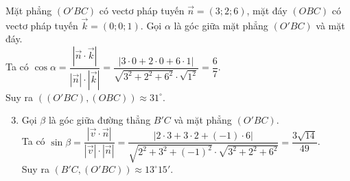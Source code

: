 \begin{vd}
{{
		}
		Mặt phẳng $(O'BC)$ có vectơ pháp tuyến $\overrightarrow{n}=(3;2;6)$, mặt đáy $(OBC)$ có vectơ pháp tuyến $\overrightarrow{k}=(0;0;1)$. Gọi $\alpha$ là góc giữa mặt phẳng $(O'BC)$ và mặt đáy.\\
		Ta có $\cos\alpha =\dfrac{\left |\overrightarrow{n}\cdot\overrightarrow{k} \right |}{\left |\overrightarrow{n} \right |\cdot\left |\overrightarrow{k} \right |}=\dfrac{\left |3\cdot 0+2\cdot 0+6\cdot 1 \right |}{\sqrt{3^2+2^2+6^2}\cdot\sqrt{1^2}}=\dfrac{6}{7}$.\\
		Suy ra $\left ((O'BC),(OBC) \right )\approx 31^{\circ}$.
		\begin{enumerate}
			\setcounter{enumi}{2}
			\item Gọi $\beta$ là góc giữa đường thẳng $B'C$ và mặt phẳng $(O'BC)$.\\
			Ta có $\sin\beta =\dfrac{\left |\overrightarrow{v}\cdot\overrightarrow{n} \right |}{\left |\overrightarrow{v} \right |\cdot\left |\overrightarrow{n} \right |}=\dfrac{\left |2\cdot 3+3\cdot 2+(-1)\cdot 6 \right |}{\sqrt{2^2+3^2+(-1)^2}\cdot\sqrt{3^2+2^2+6^2}}=\dfrac{3\sqrt{14}}{49}$.\\
			Suy ra $(B'C,(O'BC))\approx 13^{\circ}15'$.
		\end{enumerate}
	}
\end{vd}
